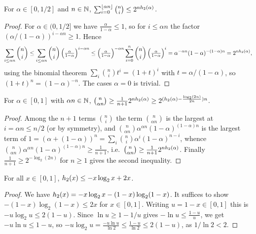 \begin{lemma}
  \label{lem:entropy-binom-upper}
  For $\alpha \in [0,1/2]$ and $n \in \mathbb{N}$,
  $\sum_{i=0}^{\lfloor \alpha n\rfloor}\binom{n}{i} \leq 2^{nh_2(\alpha)}$.
\end{lemma}
\begin{proof}
  For $\alpha \in (0,1/2]$ we have $\frac{\alpha}{1-\alpha}\leq 1$, so for
  $i \leq \alpha n$ the factor $(\alpha/(1-\alpha))^{i - \alpha n}\geq 1$. Hence
  \[
    \sum_{i \leq \alpha n}\binom{n}{i}
      \leq \sum_{i \leq \alpha n}\binom{n}{i}
        \left(\tfrac{\alpha}{1-\alpha}\right)^{i-\alpha n}
      \leq \left(\tfrac{\alpha}{1-\alpha}\right)^{-\alpha n}
        \sum_{i=0}^n \binom{n}{i}\left(\tfrac{\alpha}{1-\alpha}\right)^{i}
      = \alpha^{-\alpha n}(1-\alpha)^{-(1-\alpha)n} = 2^{nh_2(\alpha)},
  \]
  using the binomial theorem $\sum_i \binom{n}{i}t^i = (1+t)^i$ with
  $t = \alpha/(1-\alpha)$, so $(1+t)^n = (1-\alpha)^{-n}$. The cases $\alpha = 0$
  is trivial.
\end{proof}

\begin{lemma}
  \label{lem:entropy-binom-lower}
  For $\alpha \in [0,1]$ with $\alpha n \in \mathbb{N}$,
  $\binom{n}{\alpha n} \geq \frac{1}{n+1}2^{nh_2(\alpha)} \geq
  2^{(h_2(\alpha) - \frac{\log_2(2n)}{2n})n}$.
\end{lemma}
\begin{proof}
  Among the $n+1$ terms $\binom{n}{i}$ the term $\binom{n}{\alpha n}$ is the
  largest at $i = \alpha n \leq n/2$ (or by symmetry), and $\binom{n}{\alpha n}
  \alpha^{\alpha n}(1-\alpha)^{(1-\alpha)n}$ is the largest term of
  $1 = (\alpha + (1-\alpha))^n = \sum_i \binom{n}{i}\alpha^i(1-\alpha)^{n-i}$,
  whence $\binom{n}{\alpha n}\alpha^{\alpha n}(1-\alpha)^{(1-\alpha)n}\geq
  \frac{1}{n+1}$, i.e.\ $\binom{n}{\alpha n}\geq \frac{1}{n+1}2^{nh_2(\alpha)}$.
  Finally $\frac{1}{n+1}\geq 2^{-\log_2(2n)}$ for $n \geq 1$ gives the second
  inequality.
\end{proof}

\begin{lemma}
  \label{lem:h2-upper-linear}
  For all $x \in [0,1]$, $h_2(x) \leq -x\log_2 x + 2x$.
\end{lemma}
\begin{proof}
  We have $h_2(x) = -x\log_2 x - (1-x)\log_2(1-x)$. It suffices to show
  $-(1-x)\log_2(1-x) \leq 2x$ for $x \in [0,1]$. Writing $u = 1-x \in [0,1]$ this
  is $-u\log_2 u \leq 2(1-u)$. Since $\ln u \geq 1 - 1/u$ gives
  $-\ln u \leq \frac{1-u}{u}$, we get $-u\ln u \leq 1-u$, so
  $-u\log_2 u = \frac{-u\ln u}{\ln 2}\leq \frac{1-u}{\ln 2}\leq 2(1-u)$, as
  $1/\ln 2 < 2$.
\end{proof}

